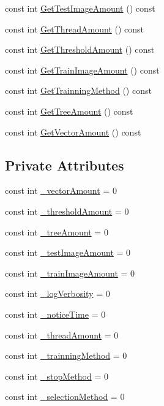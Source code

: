 \begin{DoxyCompactItemize}
\item 
const int \hyperlink{classConfigData_a755f73287c31ab6ad686547c0f67641a}{Get\+Test\+Image\+Amount} () const 
\item 
const int \hyperlink{classConfigData_a72073a22e8dd10a9c354e8821d25abd4}{Get\+Thread\+Amount} () const 
\item 
const int \hyperlink{classConfigData_a1a0ff65311568910ec2c6145a8faf87b}{Get\+Threshold\+Amount} () const 
\item 
const int \hyperlink{classConfigData_a1532f5d948132842e62a59eec102b39d}{Get\+Train\+Image\+Amount} () const 
\item 
const int \hyperlink{classConfigData_a41a99ccfad14823c0e269c5a77573ddb}{Get\+Trainning\+Method} () const 
\item 
const int \hyperlink{classConfigData_aeca2d4ca7e24db214de7f7d696ac6658}{Get\+Tree\+Amount} () const 
\item 
const int \hyperlink{classConfigData_aa72a285feefdc4fb2706b84c98e98578}{Get\+Vector\+Amount} () const 
\end{DoxyCompactItemize}
\subsection*{Private Attributes}
\begin{DoxyCompactItemize}
\item 
const int \hyperlink{classConfigData_af590033be1d5469272aa1010353232d5}{\+\_\+vector\+Amount} = 0
\item 
const int \hyperlink{classConfigData_a1956520556b7b407196a5b4153f6b083}{\+\_\+threshold\+Amount} = 0
\item 
const int \hyperlink{classConfigData_a4a8f85fa6d12865575b2226939964a09}{\+\_\+tree\+Amount} = 0
\item 
const int \hyperlink{classConfigData_a40355707f3b365a9b83b7530e0de1316}{\+\_\+test\+Image\+Amount} = 0
\item 
const int \hyperlink{classConfigData_aa9ece3a15e191b330db21d48b4f092e2}{\+\_\+train\+Image\+Amount} = 0
\item 
const int \hyperlink{classConfigData_aa8483944273e9eaa13dff184a8079633}{\+\_\+log\+Verbosity} = 0
\item 
const int \hyperlink{classConfigData_a1b82ac5b308abfd0e5a8e4eccec72076}{\+\_\+notice\+Time} = 0
\item 
const int \hyperlink{classConfigData_a349c395a667ed45ff0fc4bd0753e890b}{\+\_\+thread\+Amount} = 0
\item 
const int \hyperlink{classConfigData_a161bf96e6b8d33d2bf10b86f82546b36}{\+\_\+trainning\+Method} = 0
\item 
const int \hyperlink{classConfigData_a0f6db7bbe04644529713729e929b67c0}{\+\_\+stop\+Method} = 0
\item 
const int \hyperlink{classConfigData_a348ab0349d09526606e839a639881172}{\+\_\+selection\+Method} = 0
\end{DoxyCompactItemize}


